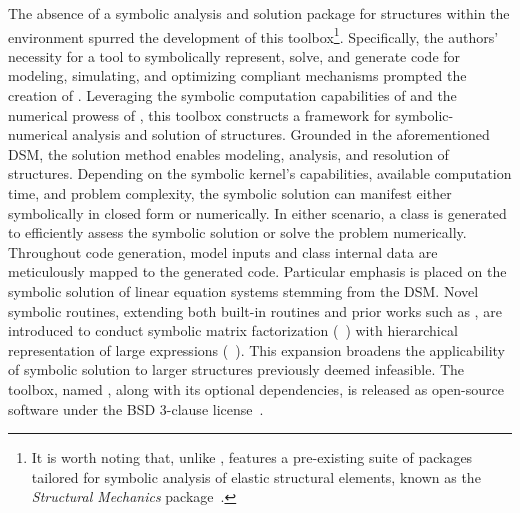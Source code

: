 The absence of a symbolic analysis and solution package for structures within the \Maple{} environment spurred the development of this toolbox\footnote{It is worth noting that, unlike \Maple{}, \Mathematica{} features a pre-existing suite of packages tailored for symbolic analysis of elastic structural elements, known as the \emph{Structural Mechanics} package~\cite{structuralmechanics}.}. Specifically, the authors' necessity for a tool to symbolically represent, solve, and generate code for modeling, simulating, and optimizing compliant mechanisms prompted the creation of \TrussMe{}. Leveraging the symbolic computation capabilities of \Maple{} and the numerical prowess of \Matlab{}, this toolbox constructs a framework for symbolic-numerical analysis and solution of structures. Grounded in the aforementioned \ac{DSM}, the solution method enables modeling, analysis, and resolution of structures. Depending on the symbolic kernel's capabilities, available computation time, and problem complexity, the symbolic solution can manifest either symbolically in closed form or numerically. In either scenario, a \Matlab{} class is generated to efficiently assess the symbolic solution or solve the problem numerically. Throughout code generation, model inputs and class internal data are meticulously mapped to the generated code. Particular emphasis is placed on the symbolic solution of linear equation systems stemming from the \ac{DSM}. Novel symbolic routines, extending both built-in \Maple{} routines and prior works such as \cite{carette2006linear, zhou2007symbolic}, are introduced to conduct symbolic matrix factorization (\LAST{}~\cite{last}) with hierarchical representation of large expressions (\LEM{}~\cite{lem}). This expansion broadens the applicability of symbolic solution to larger structures previously deemed infeasible. The toolbox, named \TrussMe{}, along with its optional dependencies, is released as open-source software under the BSD 3-clause license~\cite{trussme}.


